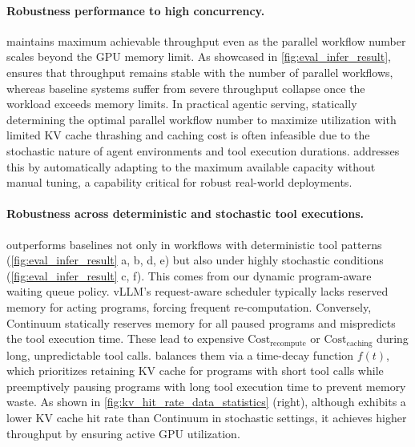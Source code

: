 \paragraph{Robustness performance to high concurrency.}
\ouralg maintains maximum achievable throughput even as the parallel workflow number scales beyond the GPU memory limit. As showcased in \autoref{fig:eval_infer_result}, \ouralg ensures that throughput remains stable with the number of parallel workflows, whereas baseline systems suffer from severe throughput collapse once the workload exceeds memory limits. In practical agentic serving, statically determining the optimal parallel workflow number to maximize utilization with limited KV cache thrashing and caching cost is often infeasible due to the stochastic nature of agent environments and tool execution durations. \ouralg addresses this by automatically adapting to the maximum available capacity without manual tuning, a capability critical for robust real-world deployments.

\paragraph{Robustness across deterministic and stochastic tool executions.}
\ouralg outperforms baselines not only in workflows with deterministic tool patterns (\autoref{fig:eval_infer_result} a, b, d, e) but also under highly stochastic conditions (\autoref{fig:eval_infer_result} c, f).
This comes from our dynamic program-aware waiting queue policy. vLLM's request-aware scheduler typically lacks reserved memory for acting programs, forcing frequent re-computation. Conversely, Continuum statically reserves memory for all paused programs and mispredicts the tool execution time. These lead to expensive $\text{Cost}_{\text{recompute}}$ or $\text{Cost}_{\text{caching}}$ during long, unpredictable tool calls.
\ouralg balances them via a time-decay function $f(t)$, which prioritizes retaining KV cache for programs with short tool calls while preemptively pausing programs with long tool execution time to prevent memory waste.
As shown in \autoref{fig:kv_hit_rate_data_statistics} (right), although \ouralg exhibits a lower KV cache hit rate than Continuum in stochastic settings, it achieves higher throughput by ensuring active GPU utilization.

